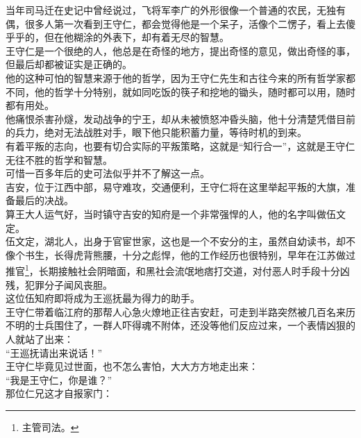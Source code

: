 \begin{multicols}{\theparacolNo}
当年司马迁在史记中曾经说过，飞将军李广的外形很像一个普通的农民，无独有偶，很多人第一次看到王守仁，都会觉得他是一个呆子，活像个二愣子，看上去傻乎乎的，但在他糊涂的外表下，却有着无尽的智慧。\\

王守仁是一个很绝的人，他总是在奇怪的地方，提出奇怪的意见，做出奇怪的事，但最后却都被证实是正确的。\\

他的这种可怕的智慧来源于他的哲学，因为王守仁先生和古往今来的所有哲学家都不同，他的哲学十分特别，就如同吃饭的筷子和挖地的锄头，随时都可以用，随时都有用处。\\

他痛恨杀害孙燧，发动战争的宁王，却从未被愤怒冲昏头脑，他十分清楚凭借目前的兵力，绝对无法战胜对手，眼下他只能积蓄力量，等待时机的到来。\\

有着平叛的志向，也要有切合实际的平叛策略，这就是“知行合一”，这就是王守仁无往不胜的哲学和智慧。\\

可惜一百多年后的史可法似乎并不了解这一点。\\

吉安，位于江西中部，易守难攻，交通便利，王守仁将在这里举起平叛的大旗，准备最后的决战。\\

算王大人运气好，当时镇守吉安的知府是一个非常强悍的人，他的名字叫做伍文定。\\

伍文定，湖北人，出身于官宦世家，这也是一个不安分的主，虽然自幼读书，却不像个书生，长得虎背熊腰，十分之彪悍，他的工作经历也很特别，早年在江苏做过推官\footnote{主管司法。}，长期接触社会阴暗面，和黑社会流氓地痞打交道，对付恶人时手段十分凶残，犯罪分子闻风丧胆。\\

这位伍知府即将成为王巡抚最为得力的助手。\\

王守仁带着临江府的那帮人心急火燎地正往吉安赶，可走到半路突然被几百名来历不明的士兵围住了，一群人吓得魂不附体，还没等他们反应过来，一个表情凶狠的人就站了出来：\\

“王巡抚请出来说话！”\\

王守仁毕竟见过世面，也不怎么害怕，大大方方地走出来：\\

“我是王守仁，你是谁？”\\

那位仁兄这才自报家门：\\


\end{multicols}
